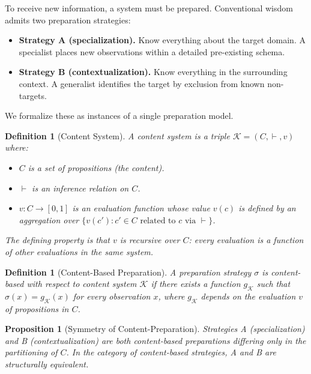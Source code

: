 \documentclass[11pt,twocolumn,a4paper]{article}
\newtheorem{proposition}[theorem]{Proposition}
\newtheorem{definition}[theorem]{Definition}
\begin{document}
To receive new information, a system must be prepared. Conventional wisdom admits two preparation strategies:

\begin{itemize}[leftmargin=*]
\item \textbf{Strategy A (specialization).} Know everything about the target domain. A specialist places new observations within a detailed pre-existing schema.
\item \textbf{Strategy B (contextualization).} Know everything in the surrounding context. A generalist identifies the target by exclusion from known non-targets.
\end{itemize}

We formalize these as instances of a single preparation model.

\begin{definition}[Content System]
\label{def:content_system}
A \emph{content system} is a triple $\mathcal{K} = (C, \vdash, v)$ where:
\begin{itemize}
\item $C$ is a set of propositions (the content).
\item $\vdash$ is an inference relation on $C$.
\item $v: C \to [0,1]$ is an evaluation function whose value $v(c)$ is defined by an aggregation over $\{v(c') : c' \in C \text{ related to } c \text{ via } \vdash\}$.
\end{itemize}
The defining property is that $v$ is recursive over $C$: every evaluation is a function of other evaluations in the same system.
\end{definition}

\begin{definition}[Content-Based Preparation]
\label{def:content_prep}
A preparation strategy $\sigma$ is \emph{content-based} with respect to content system $\mathcal{K}$ if there exists a function $g_\mathcal{K}$ such that $\sigma(x) = g_\mathcal{K}(x)$ for every observation $x$, where $g_\mathcal{K}$ depends on the evaluation $v$ of propositions in $C$.
\end{definition}

\begin{proposition}[Symmetry of Content-Preparation]
\label{prop:content_symmetry}
Strategies A (specialization) and B (contextualization) are both content-based preparations differing only in the partitioning of $C$. In the category of content-based strategies, A and B are structurally equivalent.
\end{proposition}
\end{document}
